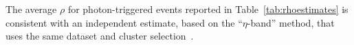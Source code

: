 The average $\rho$ for photon-triggered events reported in Table~\ref{tab:rhoestimates} is consistent with an independent estimate, based on the ``$\eta$-band'' method, that uses the same dataset and cluster selection~\cite{Erwann}. 







